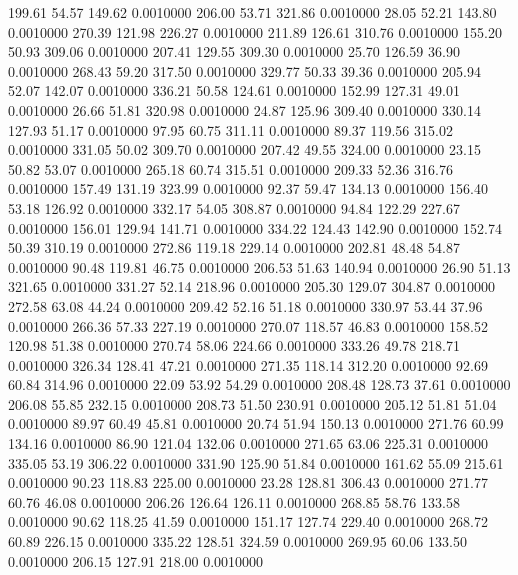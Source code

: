  199.61   54.57  149.62   0.0010000
 206.00   53.71  321.86   0.0010000
  28.05   52.21  143.80   0.0010000
 270.39  121.98  226.27   0.0010000
 211.89  126.61  310.76   0.0010000
 155.20   50.93  309.06   0.0010000
 207.41  129.55  309.30   0.0010000
  25.70  126.59   36.90   0.0010000
 268.43   59.20  317.50   0.0010000
 329.77   50.33   39.36   0.0010000
 205.94   52.07  142.07   0.0010000
 336.21   50.58  124.61   0.0010000
 152.99  127.31   49.01   0.0010000
  26.66   51.81  320.98   0.0010000
  24.87  125.96  309.40   0.0010000
 330.14  127.93   51.17   0.0010000
  97.95   60.75  311.11   0.0010000
  89.37  119.56  315.02   0.0010000
 331.05   50.02  309.70   0.0010000
 207.42   49.55  324.00   0.0010000
  23.15   50.82   53.07   0.0010000
 265.18   60.74  315.51   0.0010000
 209.33   52.36  316.76   0.0010000
 157.49  131.19  323.99   0.0010000
  92.37   59.47  134.13   0.0010000
 156.40   53.18  126.92   0.0010000
 332.17   54.05  308.87   0.0010000
  94.84  122.29  227.67   0.0010000
 156.01  129.94  141.71   0.0010000
 334.22  124.43  142.90   0.0010000
 152.74   50.39  310.19   0.0010000
 272.86  119.18  229.14   0.0010000
 202.81   48.48   54.87   0.0010000
  90.48  119.81   46.75   0.0010000
 206.53   51.63  140.94   0.0010000
  26.90   51.13  321.65   0.0010000
 331.27   52.14  218.96   0.0010000
 205.30  129.07  304.87   0.0010000
 272.58   63.08   44.24   0.0010000
 209.42   52.16   51.18   0.0010000
 330.97   53.44   37.96   0.0010000
 266.36   57.33  227.19   0.0010000
 270.07  118.57   46.83   0.0010000
 158.52  120.98   51.38   0.0010000
 270.74   58.06  224.66   0.0010000
 333.26   49.78  218.71   0.0010000
 326.34  128.41   47.21   0.0010000
 271.35  118.14  312.20   0.0010000
  92.69   60.84  314.96   0.0010000
  22.09   53.92   54.29   0.0010000
 208.48  128.73   37.61   0.0010000
 206.08   55.85  232.15   0.0010000
 208.73   51.50  230.91   0.0010000
 205.12   51.81   51.04   0.0010000
  89.97   60.49   45.81   0.0010000
  20.74   51.94  150.13   0.0010000
 271.76   60.99  134.16   0.0010000
  86.90  121.04  132.06   0.0010000
 271.65   63.06  225.31   0.0010000
 335.05   53.19  306.22   0.0010000
 331.90  125.90   51.84   0.0010000
 161.62   55.09  215.61   0.0010000
  90.23  118.83  225.00   0.0010000
  23.28  128.81  306.43   0.0010000
 271.77   60.76   46.08   0.0010000
 206.26  126.64  126.11   0.0010000
 268.85   58.76  133.58   0.0010000
  90.62  118.25   41.59   0.0010000
 151.17  127.74  229.40   0.0010000
 268.72   60.89  226.15   0.0010000
 335.22  128.51  324.59   0.0010000
 269.95   60.06  133.50   0.0010000
 206.15  127.91  218.00   0.0010000
